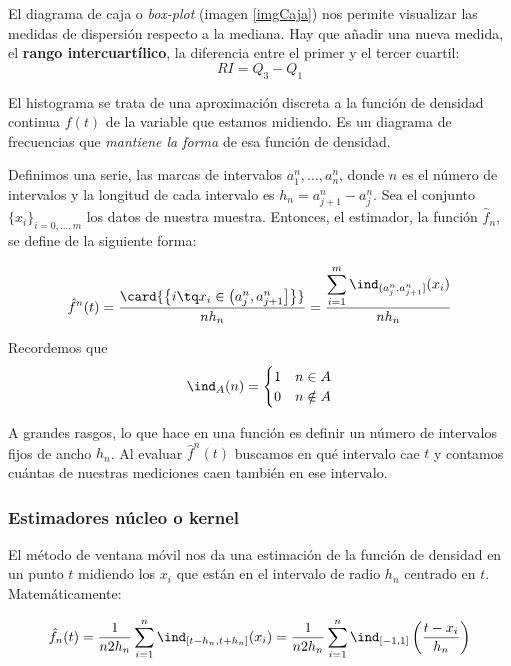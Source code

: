 \documentclass{apuntes}
\begin{document}
\begin{defn}
El diagrama de caja o \textit{box-plot}  (imagen \ref{imgCaja}) nos permite visualizar las medidas de dispersión respecto a la mediana. Hay que añadir una nueva medida, el \textbf{rango intercuartílico}, la diferencia entre el primer y el tercer cuartil: \[RI = Q_3 - Q_1 \]

\end{defn}

\begin{defn}[Histograma]
El histograma se trata de una aproximación discreta a la función de densidad continua $f(t)$ de la variable que estamos midiendo. Es un diagrama de frecuencias que \textit{mantiene la forma} de esa función de densidad. 

Definimos una serie, las marcas de intervalos $a^n_1, \dotsc, a^n_n$, donde $n$ es el número de intervalos y la longitud de cada intervalo  es $h_n = a^n_{j+1} - a^n_j$. Sea el conjunto $\{x_i\}_{i=0,\dotsc,m}$ los datos de nuestra muestra. Entonces, el estimador, la función $\hat{f}_n$, se define de la siguiente forma:

\[ \hat{f}^n(t) = \frac{\card{\left\{i \tq x_i \in \left( a_j^n, a_{j+1}^n \right]\right\}}}{n h_n} = \frac{\displaystyle\sum_{i=1}^m \ind_{(a_j^n, a_{j+1}^n]} (x_i)}{n h_n} \]

Recordemos que \[ \ind_A (n) = \begin{cases} 1 & n \in A \\ 0 & n \notin A\end{cases}\]

A grandes rasgos, lo que hace en una función es definir un número de intervalos fijos de ancho $h_n$. Al evaluar $\hat{f}^n(t)$ buscamos en qué intervalo cae $t$ y contamos cuántas de nuestras mediciones caen también en ese intervalo.


\end{defn}

\subsubsection{Estimadores núcleo o kernel}
\label{secEst}
\begin{defn}
El método de ventana móvil nos da una estimación de la función de densidad en un punto $t$ midiendo los $x_i$ que están en el intervalo de radio $h_n$ centrado en $t$. Matemáticamente:

\[ \hat{f}_n(t) = \frac{1}{n2h_n}\sum_{i=1}^n \ind_{[t-h_n, t+h_n]}(x_i) = \frac{1}{n2h_n}\sum_{i=1}^n \ind_{[-1,1]}\left(\frac{t-x_i}{h_n}\right) \]
\end{defn}
\end{document}
